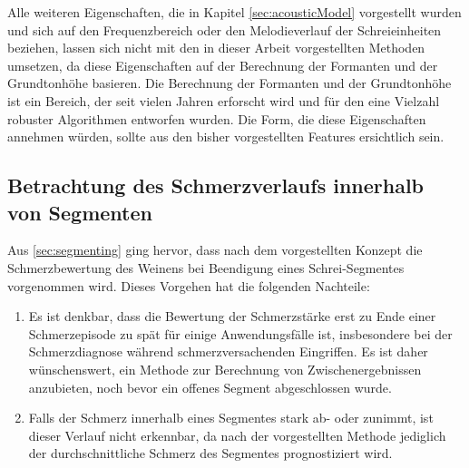 Alle weiteren Eigenschaften, die in Kapitel \ref{sec:acousticModel} vorgestellt wurden und sich auf den Frequenzbereich oder den Melodieverlauf der Schreieinheiten beziehen, lassen sich nicht mit den in dieser Arbeit vorgestellten Methoden umsetzen, da diese Eigenschaften auf der Berechnung der Formanten und der Grundtonhöhe basieren. Die Berechnung der Formanten und der Grundtonhöhe ist ein Bereich, der seit vielen Jahren erforscht wird und für den eine Vielzahl robuster Algorithmen entworfen wurden. Die Form, die diese Eigenschaften annehmen würden, sollte aus den bisher vorgestellten Features ersichtlich sein. 


\subsection{Betrachtung des Schmerzverlaufs innerhalb von Segmenten}
\label{sec:regressionTimeStuff}

Aus \autoref{sec:segmenting} ging hervor, dass nach dem vorgestellten Konzept die Schmerzbewertung des Weinens bei Beendigung eines Schrei-Segmentes vorgenommen wird. Dieses Vorgehen hat die folgenden Nachteile:
\begin{enumerate}
\item Es ist denkbar, dass die Bewertung der Schmerzstärke erst zu Ende einer Schmerzepisode zu spät für einige Anwendungsfälle ist, insbesondere bei der Schmerzdiagnose während schmerzversachenden Eingriffen. Es ist daher wünschenswert, ein Methode zur Berechnung von \glqq Zwischenergebnissen\grqq{} anzubieten, noch bevor ein offenes Segment abgeschlossen wurde.
\item Falls der Schmerz innerhalb eines Segmentes stark ab- oder zunimmt, ist dieser Verlauf nicht erkennbar, da nach der vorgestellten Methode jediglich der \glqq durchschnittliche Schmerz\grqq{} des Segmentes prognostiziert wird.
\end{enumerate}

